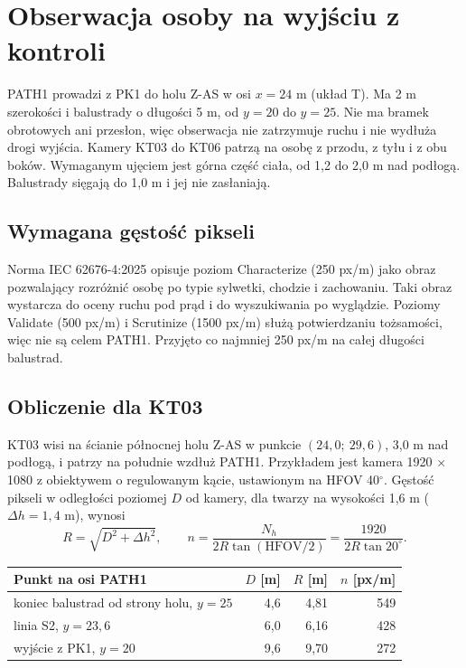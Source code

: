 \section{Obserwacja osoby na wyjściu z kontroli}

PATH1 prowadzi z PK1 do holu Z-AS w osi $x=24$ m (układ T). Ma 2 m szerokości i balustrady o długości 5 m, od $y=20$ do $y=25$. Nie ma bramek obrotowych ani przesłon, więc obserwacja nie zatrzymuje ruchu i nie wydłuża drogi wyjścia. Kamery KT03 do KT06 patrzą na osobę z przodu, z tyłu i z obu boków. Wymaganym ujęciem jest górna część ciała, od 1,2 do 2,0 m nad podłogą. Balustrady sięgają do 1,0 m i jej nie zasłaniają.


\subsection*{Wymagana gęstość pikseli}
Norma IEC 62676-4:2025 opisuje poziom Characterize (250 px/m) jako obraz pozwalający rozróżnić osobę po typie sylwetki, chodzie i zachowaniu. Taki obraz wystarcza do oceny ruchu pod prąd i do wyszukiwania po wyglądzie. Poziomy Validate (500 px/m) i Scrutinize (1500 px/m) służą potwierdzaniu tożsamości, więc nie są celem PATH1. Przyjęto co najmniej 250 px/m na całej długości balustrad.\cite{S-PXD}

\subsection*{Obliczenie dla KT03}
KT03 wisi na ścianie północnej holu Z-AS w punkcie $(24{,}0;\ 29{,}6)$, 3,0 m nad podłogą, i patrzy na południe wzdłuż PATH1. Przykładem jest kamera 1920 $\times$ 1080 z obiektywem o regulowanym kącie, ustawionym na HFOV 40$^\circ$.\cite{S-CAM} Gęstość pikseli w odległości poziomej $D$ od kamery, dla twarzy na wysokości 1,6 m ($\Delta h = 1{,}4$ m), wynosi
\[
R = \sqrt{D^2 + \Delta h^2},\qquad
n = \frac{N_h}{2R\tan(\mathrm{HFOV}/2)} = \frac{1920}{2R\tan 20^\circ}.
\]

\begin{center}
\small
\begin{tabular}{@{}lrrr@{}}
\toprule
Punkt na osi PATH1 & $D$ [m] & $R$ [m] & $n$ [px/m] \\
\midrule
koniec balustrad od strony holu, $y=25$ & 4,6 & 4,81 & 549 \\
linia S2, $y=23{,}6$ & 6,0 & 6,16 & 428 \\
wyjście z PK1, $y=20$ & 9,6 & 9,70 & 272 \\
\bottomrule
\end{tabular}
\end{center}

